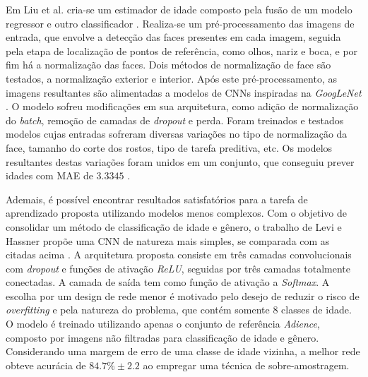 Em  Liu et al. cria-se um estimador de idade composto pela fusão de um modelo regressor e outro classificador \cite{liu2015agenet}. Realiza-se um pré-processamento das imagens de entrada, que envolve a detecção das faces presentes em cada imagem, seguida pela etapa de localização de pontos de referência, como olhos, nariz e boca, e por fim há a normalização das faces. Dois métodos de normalização de face são testados, a normalização exterior e interior. Após este pré-processamento, as imagens resultantes são alimentadas a modelos de CNNs inspiradas na \emph{GoogLeNet} \cite{inception}. O modelo sofreu modificações em sua arquitetura, como adição de normalização do \emph{batch}, remoção de camadas de \emph{dropout} e perda. Foram treinados e testados modelos cujas entradas sofreram diversas variações no tipo de normalização da face, tamanho do corte dos rostos, tipo de tarefa preditiva, etc. Os modelos resultantes destas variações foram unidos em um conjunto, que conseguiu prever idades com MAE de $3.3345$ \cite{liu2015agenet}.

Ademais, é possível encontrar resultados satisfatórios para a tarefa de aprendizado proposta utilizando modelos menos complexos. Com o objetivo de consolidar um método de classificação de idade e gênero, o trabalho de Levi e Hassner  propõe uma CNN de natureza mais simples, se comparada com as citadas acima \cite{levi2015age}. A arquitetura proposta consiste em três camadas convolucionais com \emph{dropout} e funções de ativação \emph{ReLU}, seguidas por três camadas totalmente conectadas. A camada de saída tem como função de ativação a  \emph{Softmax}. A escolha por um design de rede menor é motivado pelo desejo de reduzir o risco de \emph{overfitting} e pela natureza do problema, que contém somente 8 classes de idade. O modelo é treinado utilizando apenas o conjunto de referência \emph{Adience}, composto por imagens não filtradas para classificação de idade e gênero. Considerando uma margem de erro de uma classe de idade vizinha, a melhor rede obteve acurácia de $84.7\% \pm 2.2$ ao empregar uma técnica de sobre-amostragem.
